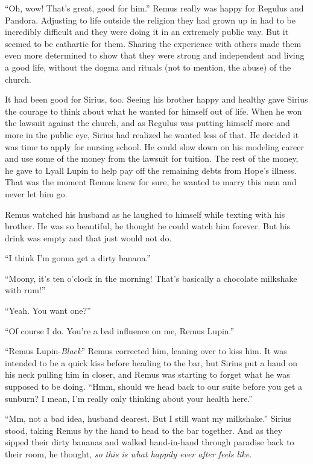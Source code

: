 \documentclass[12pt,twoside,openright]{memoir}
\begin{document}
``Oh, wow! That's great, good for him.'' Remus really was happy for Regulus and Pandora. Adjusting to life outside the religion they had grown up in had to be incredibly difficult and they were doing it in an extremely public way. But it seemed to be cathartic for them. Sharing the experience with others made them even more determined to show that they were strong and independent and living a good life, without the dogma and rituals (not to mention, the abuse) of the church.

It had been good for Sirius, too. Seeing his brother happy and healthy gave Sirius the courage to think about what he wanted for himself out of life. When he won the lawsuit against the church, and as Regulus was putting himself more and more in the public eye, Sirius had realized he wanted less of that. He decided it was time to apply for nursing school. He could slow down on his modeling career and use some of the money from the lawsuit for tuition. The rest of the money, he gave to Lyall Lupin to help pay off the remaining debts from Hope's illness. That was the moment Remus knew for sure, he wanted to marry this man and never let him go.

Remus watched his husband as he laughed to himself while texting with his brother. He was so beautiful, he thought he could watch him forever. But his drink was empty and that just would not do. 

``I think I'm gonna get a dirty banana.''

``Moony, it's ten o'clock in the morning! That's basically a chocolate milkshake with rum!''

``Yeah. You want one?''

``Of course I do. You're a bad influence on me, Remus Lupin.'' 

``Remus Lupin-\textit{Black}'' Remus corrected him, leaning over to kiss him. It was intended to be a quick kiss before heading to the bar, but Sirius put a hand on his neck pulling him in closer, and Remus was starting to forget what he was supposed to be doing. ``Hmm, should we head back to our suite before you get a sunburn? I mean, I'm really only thinking about your health here.'' 

``Mm, not a bad idea, husband dearest. But I still want my milkshake.'' Sirius stood, taking Remus by the hand to head to the bar together. And as they sipped their dirty bananas and walked hand-in-hand through paradise back to their room, he thought, \textit{so this is what happily ever after feels like}. 
\end{document}
